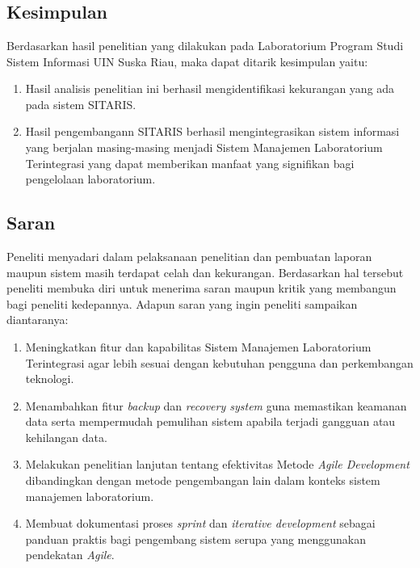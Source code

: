 %
%
%
%


\chapter{\babEnam}
\thispagestyle{fancy} %
\section{Kesimpulan}
Berdasarkan hasil penelitian yang dilakukan pada Laboratorium Program Studi Sistem Informasi UIN Suska Riau, maka dapat ditarik kesimpulan yaitu:

\begin{enumerate}
	\item Hasil analisis penelitian ini berhasil mengidentifikasi kekurangan yang ada pada sistem SITARIS.
	\item Hasil pengembangann SITARIS berhasil mengintegrasikan sistem informasi yang berjalan masing-masing menjadi Sistem Manajemen Laboratorium Terintegrasi yang dapat memberikan manfaat yang signifikan bagi pengelolaan laboratorium.
\end{enumerate}

\section{Saran}
Peneliti menyadari dalam pelaksanaan penelitian dan pembuatan laporan maupun sistem masih terdapat celah dan kekurangan. Berdasarkan hal tersebut peneliti membuka diri untuk menerima saran maupun kritik yang membangun bagi peneliti kedepannya. Adapun saran yang ingin peneliti sampaikan diantaranya:

\begin{enumerate}
	\item Meningkatkan fitur dan kapabilitas Sistem Manajemen Laboratorium Terintegrasi agar lebih sesuai dengan kebutuhan pengguna dan perkembangan teknologi.
	\item Menambahkan fitur \textit{backup} dan \textit{recovery system} guna memastikan keamanan data serta mempermudah pemulihan sistem apabila terjadi gangguan atau kehilangan data.
	\item Melakukan penelitian lanjutan tentang efektivitas Metode \textit{Agile Development} dibandingkan dengan metode pengembangan lain dalam konteks sistem manajemen laboratorium.
	\item Membuat dokumentasi proses \textit{sprint} dan \textit{iterative development} sebagai panduan praktis bagi pengembang sistem serupa yang menggunakan pendekatan \textit{Agile}.
\end{enumerate}